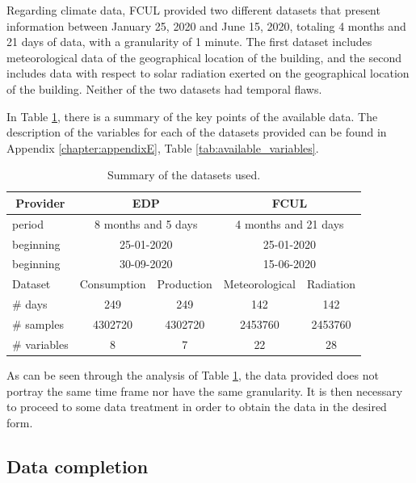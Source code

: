 Regarding climate data, \ac{FCUL} provided two different datasets that present information between January 25, 2020 and June 15, 2020, totaling 4 months and 21 days of data, with a granularity of 1 minute. The first dataset includes meteorological data of the geographical location of the building, and the second includes data with respect to solar radiation exerted on the geographical location of the building. Neither of the two datasets had temporal flaws.

In Table \ref{table2}, there is a summary of the key points of the available data. The description of the variables for each of the datasets provided can be found in Appendix \ref{chapter:appendixE}, Table \ref{tab:available_variables}.

\begin{table}[htbp]
  \centering
  \caption{Summary of the datasets used.}
    \begin{tabular}{l|c|c|c|c|}
    \multicolumn{1}{c|}{\textbf{Provider}} & \multicolumn{2}{c|}{\textbf{EDP}} & \multicolumn{2}{c|}{\textbf{FCUL}} \\
    \midrule
    period & \multicolumn{2}{c|}{8 months and 5 days} & \multicolumn{2}{c|}{4 months and 21 days} \\
    beginning & \multicolumn{2}{c|}{25-01-2020} & \multicolumn{2}{c|}{25-01-2020} \\
    beginning & \multicolumn{2}{c|}{30-09-2020} & \multicolumn{2}{c|}{15-06-2020} \\
    \midrule
    Dataset & Consumption & Production & Meteorological & Radiation \\
    \# days & 249 & 249 & 142 & 142 \\
    \# samples & 4302720 & 4302720 & 2453760 & 2453760 \\
    \# variables & 8 & 7 & 22 & 28 \\
    \end{tabular}%
  \label{table2}%
\end{table}%


As can be seen through the analysis of Table \ref{table2}, the data provided does not portray the same time frame nor have the same granularity. It is then necessary to proceed to some data treatment in order to obtain the data in the desired form.

\subsection{Data completion}\label{chap3:subsec:data_completion}

